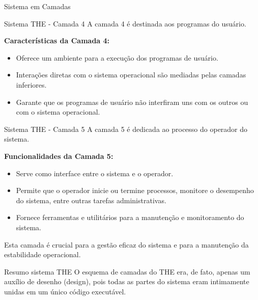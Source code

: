 \documentclass{beamer}
\begin{document}
\begin{frame}{Sistema em Camadas}
\begin{frame}{Sistema THE - Camada 4}
    A camada 4 é destinada aos programas do usuário.

    \vspace{0.5cm}

    \textbf{Características da Camada 4:}
    \begin{itemize}
        \item Oferece um ambiente para a execução dos programas de usuário.
        \item Interações diretas com o sistema operacional são mediadas pelas camadas inferiores.
        \item Garante que os programas de usuário não interfiram uns com os outros ou com o sistema operacional.
    \end{itemize}
\end{frame}
\begin{frame}{Sistema THE - Camada 5}
    A camada 5 é dedicada ao processo do operador do sistema.

    \vspace{0.5cm}

    \textbf{Funcionalidades da Camada 5:}
    \begin{itemize}
        \item Serve como interface entre o sistema e o operador.
        \item Permite que o operador inicie ou termine processos, monitore o desempenho do sistema, entre outras tarefas administrativas.
        \item Fornece ferramentas e utilitários para a manutenção e monitoramento do sistema.
    \end{itemize}

    \vspace{0.5cm}

    Esta camada é crucial para a gestão eficaz do sistema e para a manutenção da estabilidade operacional.
\end{frame}


\begin{frame}{Resumo sistema THE}
    O esquema de camadas do THE era, de fato, apenas um auxílio de desenho (design), pois todas as partes do sistema eram intimamente unidas em um único código executável.
\end{frame}



\end{frame}
\end{document}
